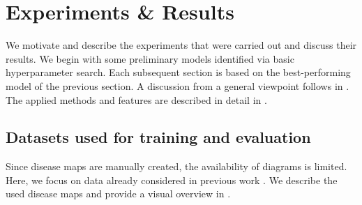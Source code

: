 \documentclass[
	fontsize=10pt, %
	twoside=false, %
	secnumdepth=1, %
  toc=indentunnumbered %
]{kaobook}
\begin{document}





% 



\chapter{Experiments \& Results}
\label{sec:experiments-results}

We motivate and describe the experiments that were carried out and discuss their
results. We begin with some preliminary models identified via basic
hyperparameter search. Each subsequent section is based on the best-performing
model of the previous section. A discussion from a general viewpoint follows in
. The applied methods and features are described in detail in
.

\section{Datasets used for training and evaluation}
\label{sec:datasets-used}

Since disease maps are manually created, the availability of diagrams is
limited.
Here, we focus on data already considered in previous work
\cite{nielsen_MachineLearningSupport_2019}. We describe the used disease maps
and provide a visual overview in .
\end{document}
